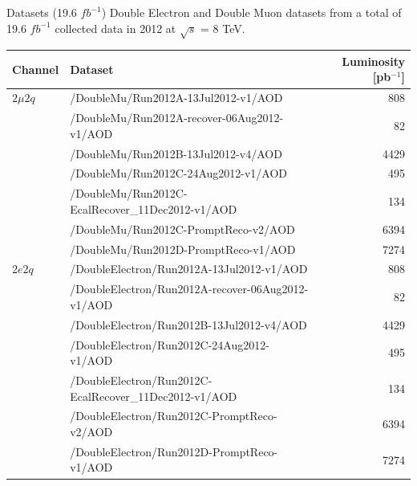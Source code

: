 \begin{frame}{Datasets (19.6 $fb^{-1}$)}
Double Electron and Double Muon datasets from a total of 19.6 $fb^{-1}$ collected data in 2012 at $\sqrt{s}$ = 8 TeV.\\
\vspace{1em}
\scriptsize
\begin{tabular}{|l|l|r|}
\hline
Channel & Dataset & Luminosity [pb$^{-1}$] \\
\hline
$2\mu2q$ & /DoubleMu/Run2012A-13Jul2012-v1/AOD & 808\\
         & /DoubleMu/Run2012A-recover-06Aug2012-v1/AOD & 82\\
         & /DoubleMu/Run2012B-13Jul2012-v4/AOD & 4429 \\
         & /DoubleMu/Run2012C-24Aug2012-v1/AOD & 495 \\
         & /DoubleMu/Run2012C-EcalRecover\_11Dec2012-v1/AOD & 134\\
         & /DoubleMu/Run2012C-PromptReco-v2/AOD & 6394\\
         & /DoubleMu/Run2012D-PromptReco-v1/AOD & 7274\\
\hline 
$2e2q$   & /DoubleElectron/Run2012A-13Jul2012-v1/AOD & 808\\
         & /DoubleElectron/Run2012A-recover-06Aug2012-v1/AOD & 82\\
         & /DoubleElectron/Run2012B-13Jul2012-v4/AOD & 4429\\
         & /DoubleElectron/Run2012C-24Aug2012-v1/AOD & 495\\
         & /DoubleElectron/Run2012C-EcalRecover\_11Dec2012-v1/AOD & 134\\
         & /DoubleElectron/Run2012C-PromptReco-v2/AOD & 6394\\
         & /DoubleElectron/Run2012D-PromptReco-v1/AOD & 7274\\
\hline
\end{tabular}

\end{frame}



